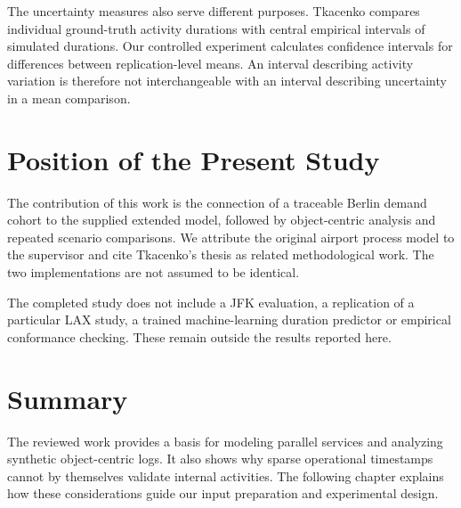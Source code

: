 The uncertainty measures also serve different purposes. Tkacenko compares individual ground-truth activity durations with central empirical intervals of simulated durations. Our controlled experiment calculates confidence intervals for differences between replication-level means. An interval describing activity variation is therefore not interchangeable with an interval describing uncertainty in a mean comparison.

\section{Position of the Present Study}
The contribution of this work is the connection of a traceable Berlin demand cohort to the supplied extended model, followed by object-centric analysis and repeated scenario comparisons. We attribute the original airport process model to the supervisor and cite Tkacenko's thesis as related methodological work. The two implementations are not assumed to be identical.

The completed study does not include a JFK evaluation, a replication of a particular LAX study, a trained machine-learning duration predictor or empirical conformance checking. These remain outside the results reported here.

\section{Summary}
The reviewed work provides a basis for modeling parallel services and analyzing synthetic object-centric logs. It also shows why sparse operational timestamps cannot by themselves validate internal activities. The following chapter explains how these considerations guide our input preparation and experimental design.
